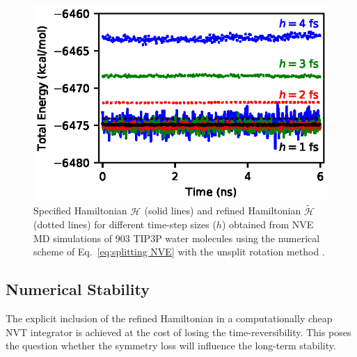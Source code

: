 \documentclass[
journal=jctcce,
layout=twocolumn
]{achemso}
\newcommand{\Ham}[1]{{\mathcal H}_\text{#1}}    %
\newcommand{\timestep}{h}
\newcommand{\refined}[1]{\widetilde{#1}}
\begin{document}
\begin{figure}
	\includegraphics{Figures/NVE.eps}
	\caption{Specified Hamiltonian $\Ham{}$ (solid lines) and refined Hamiltonian $\refined{\Ham{}}$ (dotted lines) for different time-step sizes ($\timestep$) obtained from NVE MD simulations of 903 TIP3P \cite{Jorgensen_1983} water molecules using the numerical scheme of Eq.~\eqref{eq:splitting NVE} with the unsplit rotation method \cite{Silveira_2017}.}
	\label{fig:nve}
\end{figure}

\subsection{Numerical Stability}

The explicit inclusion of the refined Hamiltonian in a computationally cheap NVT integrator is achieved at the cost of losing the time-reversibility.
This poses the question whether the symmetry loss will influence the long-term stability.
\end{document}
